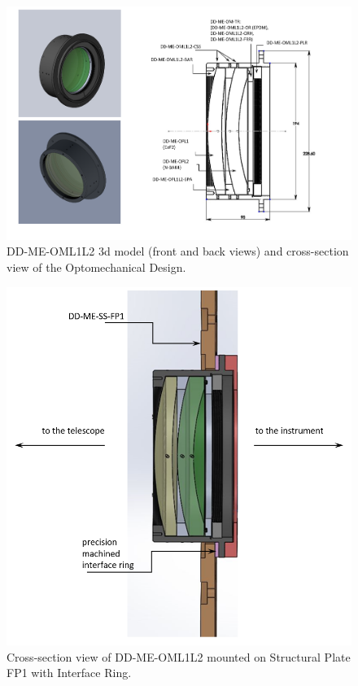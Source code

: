 \documentclass{report}
\begin{document}
\begin{figure}
\begin{center}
\includegraphics[width=1.1\linewidth]{figures/DD-ME-OML1L2-ID.png}
\end{center}
\caption{DD-ME-OML1L2 3d model (front and back views) and cross-section view of the Optomechanical Design.}
\label{figure:OML1L2-ID}
\end{figure}

\begin{figure}
\begin{center}
\includegraphics[width=0.7\linewidth]{figures/DD-ME-OML1L2_and_FP1.png}
\end{center}
\caption{Cross-section view of DD-ME-OML1L2 mounted on Structural Plate FP1 with Interface Ring.}
\label{figure:OML1L2-CSV}
\end{figure}
\end{document}
